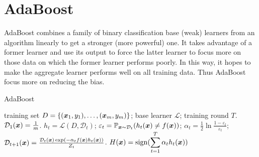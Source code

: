 \section{AdaBoost}
AdaBoost combines a family of binary classification base (weak) learners from an algorithm linearly to get a stronger (more
powerful) one. It takes advantage
of a former learner and use its output to force the latter learner to focus more on those data on which the
former learner performs poorly. In this way, it hopes to make the aggregate learner performs well on all
training data. Thus AdaBoost focus more on reducing the bias. 
\begin{algorithm}
    \caption{AdaBoost}\label{AdaBoost}
    \begin{algorithmic}[1]
        \Require training set $D = \{(\boldsymbol{x}_1, y_1), \ldots, (\boldsymbol{x}_m, y_m)\}$; base learner $\mathcal{L}$;
        training round $T$.
        \State $\mathcal{D}_1(\boldsymbol{x}) = \frac{1}{m}$.
            \State $h_t = \mathcal{L}(D, \mathcal{D}_t)$;
            \State $\varepsilon_t = \operatorname*{\mathbb{P}}_{\boldsymbol{x}\sim\mathcal{D}_t}(h_t(\boldsymbol{x})\neq f(\boldsymbol{x}))$;
            \State $\alpha_t = \frac{1}{2}\ln{\frac{1 - \varepsilon_t}{\varepsilon_t}}$;\label{AdaBoost_alphat}
            \State $\mathcal{D}_{t + 1}(\boldsymbol{x}) = \frac{\mathcal{D}_t(\boldsymbol{x})\exp(-\alpha_t f(\boldsymbol{x})h_t(\boldsymbol{x}))}
            {Z_t}$.\label{AdaBoost_distritution}
        \EndFor
        \Ensure $H(\boldsymbol{x}) = \operatorname{sign}(\displaystyle\sum_{t = 1}^T \alpha_t h_t(\boldsymbol{x}))$
    \end{algorithmic}
\end{algorithm}

